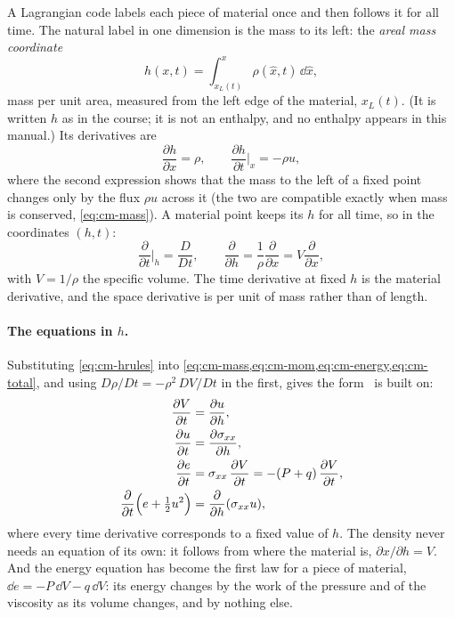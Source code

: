 A Lagrangian code labels each piece of material once and then follows it
for all time. The
natural label in one dimension is the mass to its left: the \emph{areal
mass coordinate}
\begin{equation}
h(x, t) = \int_{x_L(t)}^{x} \rho(\hat x, t)\,\dd\hat x,
\label{eq:cm-h}
\end{equation}
mass per unit area, measured from the left edge of the material,
$x_L(t)$. (It is written $h$ as in the course; it is not an enthalpy, and
no enthalpy appears in this manual.) Its derivatives are
\begin{equation}
\frac{\partial h}{\partial x} = \rho,
\qquad
\frac{\partial h}{\partial t}\Big|_x = -\rho u,
\label{eq:cm-hderiv}
\end{equation}
where the second expression shows that the mass to the left of a fixed
point changes only by
the flux $\rho u$ across it (the two are compatible exactly when mass is
conserved, \cref{eq:cm-mass}). A material point keeps its $h$ for all
time, so in the coordinates $(h, t)$:
\begin{equation}
\frac{\partial}{\partial t}\Big|_h = \frac{D}{Dt},
\qquad
\frac{\partial}{\partial h} = \frac{1}{\rho}\frac{\partial}{\partial x}
  = V\frac{\partial}{\partial x},
\label{eq:cm-hrules}
\end{equation}
with $V = 1/\rho$ the specific volume. The time derivative at fixed $h$
is the material derivative, and the space derivative is per unit of mass
rather than of length.

\paragraph{The equations in $h$.} Substituting \cref{eq:cm-hrules} into
\cref{eq:cm-mass,eq:cm-mom,eq:cm-energy,eq:cm-total}, and using
$D\rho/Dt = -\rho^2\,DV/Dt$ in the first, gives the form \bw\ is built on:
\begin{align}
\frac{\partial V}{\partial t} &= \frac{\partial u}{\partial h},
\label{eq:lag-mass}\\
\frac{\partial u}{\partial t} &= \frac{\partial \sigma_{xx}}{\partial h},
\label{eq:lag-mom}\\
\frac{\partial e}{\partial t} &= \sigma_{xx}\,\frac{\partial V}{\partial t}
  = -(P + q)\,\frac{\partial V}{\partial t},
\label{eq:lag-energy}\\
\frac{\partial}{\partial t}\Bigl(e + \tfrac{1}{2}u^2\Bigr)
  &= \frac{\partial}{\partial h}(\sigma_{xx} u),
\label{eq:lag-total}
\end{align}
where every time derivative corresponds to a fixed value of $h$. The
density never needs an equation of
its own: it follows from where the material is,
$\partial x/\partial h = V$. And the energy equation has become the first
law for a piece of material, $\dd e = -P\,\dd V - q\,\dd V$: its energy
changes by the work of the pressure and of the viscosity as its volume
changes, and by nothing else.

